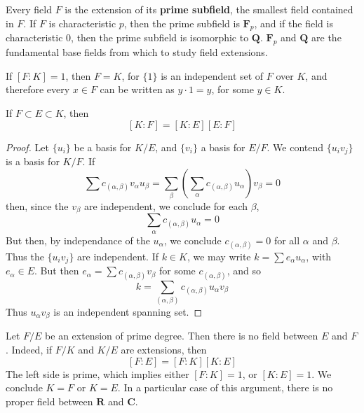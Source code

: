 \begin{example}
    Every field $F$ is the extension of its {\bf prime subfield}, the smallest field contained in $F$. If $F$ is characteristic $p$, then the prime subfield is $\mathbf{F}_p$, and if the field is characteristic 0, then the prime subfield is isomorphic to $\mathbf{Q}$. $\mathbf{F}_p$ and $\mathbf{Q}$ are the fundamental base fields from which to study field extensions.
\end{example}

\begin{example}
    If $[F:K] = 1$, then $F = K$, for $\{ 1 \}$ is an independent set of $F$ over $K$, and therefore every $x \in F$ can be written as $y \cdot 1 = y$, for some $y \in K$.
\end{example}

\begin{theorem}
    If $F \subset E \subset K$, then
    \[ [K:F] = [K: E][E: F] \]
\end{theorem}
\begin{proof}
    Let $\{ u_i \}$ be a basis for $K/E$, and $\{ v_i \}$ a basis for $E/F$. We contend $\{ u_i v_j \}$ is a basis for $K/F$. If
    \[ \sum c_{(\alpha,\beta)} v_\alpha u_\beta = \sum_\beta \left( \sum_\alpha c_{(\alpha, \beta)} u_\alpha \right) v_\beta = 0 \]
    then, since the $v_\beta$ are independent, we conclude for each $\beta$,
    \[ \sum_\alpha c_{(\alpha, \beta)} u_\alpha = 0 \]
    But then, by independance of the $u_\alpha$, we conclude $c_{(\alpha, \beta)} = 0$ for all $\alpha$ and $\beta$. Thus the $\{ u_i v_j \}$ are independent. If $k \in K$, we may write $k = \sum e_\alpha u_\alpha$, with $e_\alpha \in E$. But then $e_\alpha = \sum c_{(\alpha, \beta)} v_\beta$ for some $c_{(\alpha, \beta)}$, and so
    \[ k = \sum_{(\alpha, \beta)} c_{(\alpha, \beta)} u_\alpha v_\beta \]
    Thus $u_\alpha v_\beta$ is an independent spanning set.
\end{proof}

\begin{example}
    Let $F/E$ be an extension of prime degree. Then there is no field between $E$ and $F$. Indeed, if $F/K$ and $K/E$ are extensions, then
    \[ [F:E] = [F:K][K:E] \]
    The left side is prime, which implies either $[F:K] = 1$, or $[K:E] = 1$. We conclude $K = F$ or $K = E$. In a particular case of this argument, there is no proper field between $\mathbf{R}$ and $\mathbf{C}$.
\end{example}

